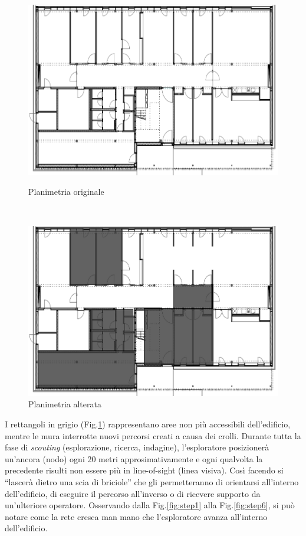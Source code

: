 \begin{figure}[h]
	\begin{minipage}[b]{6cm}
		\centering
		\includegraphics[scale=0.35]{Introduzione/piantina1.png}
		\caption{Planimetria originale}
		\label{fig:planOriginale}
	\end{minipage}
	\ \hspace{10 mm} \
	\begin{minipage}[b]{6cm}
		\centering
		\includegraphics[scale=0.35]{Introduzione/piantina2.png}
		\caption{Planimetria alterata}
		\label{fig:planAlterata}
	\end{minipage}
\end{figure}

\newpage
I rettangoli in grigio (Fig.\ref{fig:planAlterata}) rappresentano aree non più accessibili dell’edificio, mentre le mura interrotte nuovi percorsi creati a causa dei crolli. 
Durante tutta la fase di \textit{scouting} (esplorazione, ricerca, indagine), l’esploratore posizionerà un’ancora (nodo) ogni 20 metri approsimativamente e ogni qualvolta la precedente risulti non essere più in line-of-sight (linea visiva). Così facendo si “lascerà dietro una scia di briciole” che gli permetteranno di orientarsi all’interno dell’edificio, di eseguire il percorso all’inverso o di ricevere supporto da un’ulteriore operatore. Osservando dalla Fig.\ref{fig:step1} alla Fig.\ref{fig:step6}, si può notare come la rete cresca man mano che l'esploratore avanza all'interno dell'edificio.

